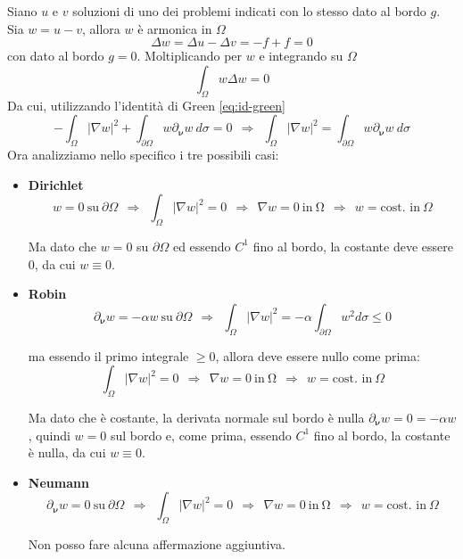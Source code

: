 \documentclass[10pt,a4paper,twoside,openright]{book}
\begin{document}
\begin{dimostrazione}
	Siano $u$ e $v$ soluzioni di uno dei problemi indicati con lo stesso dato al bordo $g$. Sia $w=u-v$, allora $w$ è armonica in $\Omega $
	\begin{equation*}
		\Delta w=\Delta u-\Delta v=-f+f=0
	\end{equation*}
	con dato al bordo $g=0$. Moltiplicando per $w$ e integrando su $\Omega $
	\begin{equation*}
		\int _{\Omega } w\Delta w=0
	\end{equation*}
	Da cui, utilizzando l'identità di Green \eqref{eq:id-green}
	\begin{equation*}
		-\int _{\Omega }| \nabla w| ^{2} +\int _{\partial \Omega } w\partial _{\bm{\nu}} w\ d\sigma =0\ \ \Rightarrow \ \ \int _{\Omega }| \nabla w| ^{2} =\int _{\partial \Omega } w\partial _{\bm{\nu}} w\ d\sigma 
	\end{equation*}
	Ora analizziamo nello specifico i tre possibili casi:
	\begin{itemize}
		\item \textbf{Dirichlet}\begin{equation*}
		w=0\ \text{su} \ \partial \Omega \ \ \Rightarrow \ \ \int _{\Omega }| \nabla w| ^{2} =0\ \ \Rightarrow \ \ \nabla w=0\ \text{in} \ \mathrm{\Omega } \ \ \Rightarrow \ \ w=\text{cost. in} \ \Omega 
		\end{equation*}

		Ma dato che $\displaystyle w=0$ su $\displaystyle \partial \Omega $ ed essendo $\displaystyle C^{1}$ fino al bordo, la costante deve essere $\displaystyle 0$, da cui $\displaystyle w\equiv 0$.
		\item \textbf{Robin}\begin{equation*}
		\partial_{\bm{\nu}} w=-\alpha w\ \text{su} \ \partial \Omega \ \ \Rightarrow \ \ \int _{\Omega }| \nabla w| ^{2} =-\alpha \int _{\partial \Omega } w^{2} d\sigma \leqslant 0
		\end{equation*}

		ma essendo il primo integrale $\displaystyle \geqslant 0$, allora deve essere nullo come prima:\begin{equation*}
		\int _{\Omega }| \nabla w| ^{2} =0\ \ \Rightarrow \ \ \nabla w=0\ \text{in} \ \mathrm{\Omega } \ \ \Rightarrow \ \ w=\text{cost. in} \ \Omega 
		\end{equation*}

		Ma dato che è costante, la derivata normale sul bordo è nulla $\displaystyle \partial_{\bm{\nu}} w=0=-\alpha w$, quindi $\displaystyle w=0$ sul bordo e, come prima, essendo $\displaystyle C^{1}$ fino al bordo, la costante è nulla, da cui $\displaystyle w\equiv 0$.
		\item \textbf{Neumann}\begin{equation*}
		\partial_{\bm{\nu}} w=0\ \text{su} \ \partial \Omega \ \ \Rightarrow \ \ \int _{\Omega }| \nabla w| ^{2} =0\ \ \Rightarrow \ \ \nabla w=0\ \text{in} \ \mathrm{\Omega } \ \ \Rightarrow \ \ w=\text{cost. in} \ \Omega 
		\end{equation*}

		Non posso fare alcuna affermazione aggiuntiva.
	\end{itemize}
\end{dimostrazione}
\end{document}
